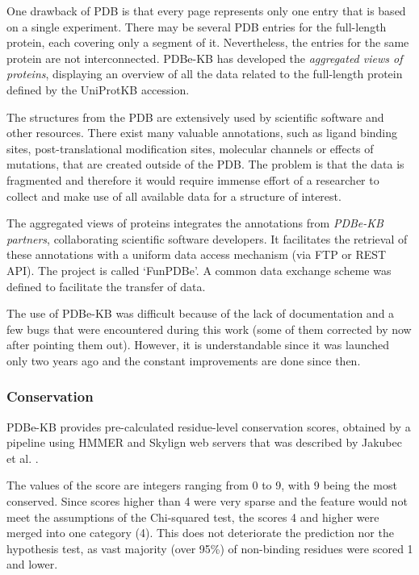 One drawback of PDB is that every page represents only one entry that is based on a single experiment. There may be several PDB entries for the full-length protein, each covering only a segment of it. Nevertheless, the entries for the same protein are not interconnected. PDBe-KB has developed the \textit{aggregated views of proteins}, displaying an overview of all the data related to the full-length protein defined by the UniProtKB accession.

The structures from the PDB are extensively used by scientific software and other resources. There exist many valuable annotations, such as ligand binding sites, post-translational modification sites, molecular channels or effects of mutations, that are created outside of the PDB. The problem is that the data is fragmented and therefore it would require immense effort of a researcher to collect and make use of all available data for a structure of interest.

The aggregated views of proteins integrates the annotations from \textit{PDBe-KB partners}, collaborating scientific software developers. It facilitates the retrieval of these annotations with a uniform data access mechanism (via FTP or REST API). The project is called `FunPDBe'. A common data exchange scheme was defined to facilitate the transfer of data. \cite{pdbekb}

The use of PDBe-KB was difficult because of the lack of documentation and a few bugs that were encountered during this work (some of them corrected by now after pointing them out). However, it is understandable since it was launched only two years ago and the constant improvements are done since then.

\subsubsection{Conservation}
PDBe-KB provides pre-calculated residue-level conservation scores, obtained by a pipeline using HMMER and Skylign web servers that was described by Jakubec et al. \cite{3dpatch}.

The values of the score are integers ranging from 0 to 9, with 9 being the most conserved. Since scores higher than 4 were very sparse and the feature would not meet the assumptions of the Chi-squared test, the scores 4 and higher were merged into one category (4). This does not deteriorate the prediction nor the hypothesis test, as vast majority (over 95\%) of non-binding residues were scored 1 and lower.


